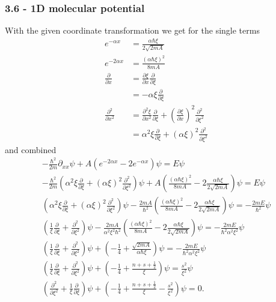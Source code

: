\documentclass[10pt,a4paper]{article}
\theoremstyle{definition}
\begin{document}
\subsubsection{3.6 - 1D molecular potential}
With the given coordinate transformation we get for the single terms
\begin{align}
    e^{-\alpha x}&=\frac{\alpha\hbar\xi}{2\sqrt{2mA}}\\
    e^{-2\alpha x}&=\frac{(\alpha\hbar\xi)^2}{8mA}\\
    \frac{\partial}{\partial x}&=\frac{\partial\xi}{\partial x}\frac{\partial}{\partial\xi}\\
    &=-\alpha\xi\frac{\partial}{\partial\xi}\\
    \frac{\partial^2}{\partial x^2}&=\frac{\partial^2\xi}{\partial x^2}\frac{\partial}{\partial\xi}+\left(\frac{\partial\xi}{\partial x}\right)^2\frac{\partial^2}{\partial\xi^2}\\
    &=\alpha^2\xi\frac{\partial}{\partial\xi}+(\alpha\xi)^2\frac{\partial^2}{\partial\xi^2}
\end{align}
and combined
\begin{align}
    -\frac{\hbar^2}{2m}\partial_{xx}\psi+A(e^{-2\alpha x}-2e^{-\alpha x})\psi=E\psi\\
    -\frac{\hbar^2}{2m}\left(\alpha^2\xi\frac{\partial}{\partial\xi}+(\alpha\xi)^2\frac{\partial^2}{\partial\xi^2}\right)\psi+A\left(\frac{(\alpha\hbar\xi)^2}{8mA}-2\frac{\alpha\hbar\xi}{2\sqrt{2mA}}\right)\psi=E\psi\\
    \left(\alpha^2\xi\frac{\partial}{\partial\xi}+(\alpha\xi)^2\frac{\partial^2}{\partial\xi^2}\right)\psi-\frac{2mA}{\hbar^2}\left(\frac{(\alpha\hbar\xi)^2}{8mA}-2\frac{\alpha\hbar\xi}{2\sqrt{2mA}}\right)\psi=-\frac{2mE}{\hbar^2}\psi\\
    \left(\frac{1}{\xi}\frac{\partial}{\partial\xi}+\frac{\partial^2}{\partial\xi^2}\right)\psi-\frac{2mA}{\alpha^2\xi^2\hbar^2}\left(\frac{(\alpha\hbar\xi)^2}{8mA}-2\frac{\alpha\hbar\xi}{2\sqrt{2mA}}\right)\psi=-\frac{2mE}{\hbar^2\alpha^2\xi^2}\psi\\
    \left(\frac{1}{\xi}\frac{\partial}{\partial\xi}+\frac{\partial^2}{\partial\xi^2}\right)\psi+\left(-\frac{1}{4}+\frac{\sqrt{2mA}}{\alpha\hbar\xi}\right)\psi=-\frac{2mE}{\hbar^2\alpha^2\xi^2}\psi\\
    \left(\frac{1}{\xi}\frac{\partial}{\partial\xi}+\frac{\partial^2}{\partial\xi^2}\right)\psi+\left(-\frac{1}{4}+\frac{n+s+\frac{1}{2}}{\xi}\right)\psi=\frac{s^2}{\xi^2}\psi\\
    \left(\frac{\partial^2}{\partial\xi^2}+\frac{1}{\xi}\frac{\partial}{\partial\xi}\right)\psi+\left(-\frac{1}{4}+\frac{n+s+\frac{1}{2}}{\xi}-\frac{s^2}{\xi^2}\right)\psi=0.
\end{align}
\end{document}
